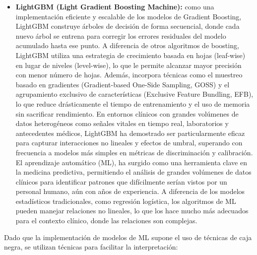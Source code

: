 \begin{itemize}
    \item \textbf{LightGBM (Light Gradient Boosting Machine):} como una implementación eficiente y escalable de los modelos de Gradient Boosting, LightGBM construye árboles de decisión de forma secuencial, donde cada nuevo árbol se entrena para corregir los errores residuales del modelo acumulado hasta ese punto. A diferencia de otros algoritmos de boosting, LightGBM utiliza una estrategia de crecimiento basada en hojas (leaf-wise) en lugar de niveles (level-wise), lo que le permite alcanzar mayor precisión con menor número de hojas. Además, incorpora técnicas como el muestreo basado en gradientes (Gradient-based One-Side Sampling, GOSS) y el agrupamiento exclusivo de características (Exclusive Feature Bundling, EFB), lo que reduce drásticamente el tiempo de entrenamiento y el uso de memoria sin sacrificar rendimiento. En entornos clínicos con grandes volúmenes de datos heterogéneos como señales vitales en tiempo real, laboratorios y antecedentes médicos, LightGBM ha demostrado ser particularmente eficaz para capturar interacciones no lineales y efectos de umbral, superando con frecuencia a modelos más simples en métricas de discriminación y calibración. El aprendizaje automático (ML), ha surgido como una herramienta clave en la medicina predictiva, permitiendo el análisis de grandes volúmenes de datos clínicos para identificar patrones que difícilmente serían vistos por un personal humano, aún con años de experiencia. A diferencia de los modelos estadísticos tradicionales, como regresión logística, los algoritmos de ML pueden manejar relaciones no lineales, lo que los hace mucho más adecuados para el contexto clínico, donde las relaciones son complejas.
\end{itemize}

Dado que la implementación de modelos de ML supone el uso de técnicas de caja negra, se utilizan técnicas para facilitar la interpretación:

